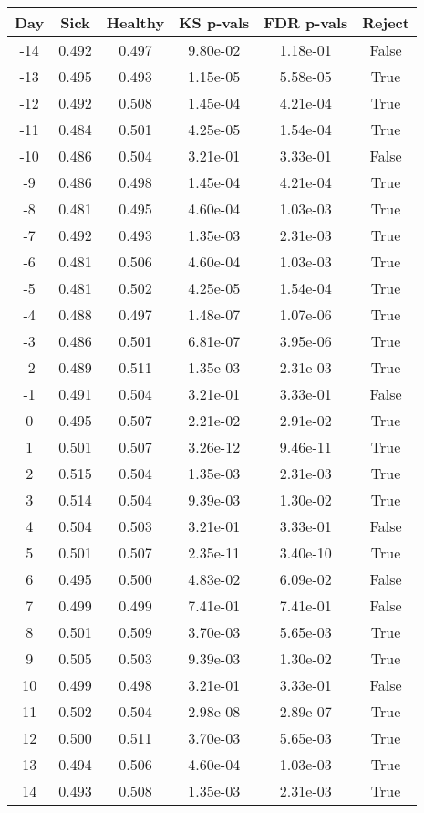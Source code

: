 \begin{tabular}{c|c|c|c|c|c}
Day &  Sick & Healthy &  KS p-vals & FDR p-vals & Reject\\
\hline
-14 & 0.492 &   0.497 &   9.80e-02 &   1.18e-01 &  False\\
-13 & 0.495 &   0.493 &   1.15e-05 &   5.58e-05 &   True\\
-12 & 0.492 &   0.508 &   1.45e-04 &   4.21e-04 &   True\\
-11 & 0.484 &   0.501 &   4.25e-05 &   1.54e-04 &   True\\
-10 & 0.486 &   0.504 &   3.21e-01 &   3.33e-01 &  False\\
 -9 & 0.486 &   0.498 &   1.45e-04 &   4.21e-04 &   True\\
 -8 & 0.481 &   0.495 &   4.60e-04 &   1.03e-03 &   True\\
 -7 & 0.492 &   0.493 &   1.35e-03 &   2.31e-03 &   True\\
 -6 & 0.481 &   0.506 &   4.60e-04 &   1.03e-03 &   True\\
 -5 & 0.481 &   0.502 &   4.25e-05 &   1.54e-04 &   True\\
 -4 & 0.488 &   0.497 &   1.48e-07 &   1.07e-06 &   True\\
 -3 & 0.486 &   0.501 &   6.81e-07 &   3.95e-06 &   True\\
 -2 & 0.489 &   0.511 &   1.35e-03 &   2.31e-03 &   True\\
 -1 & 0.491 &   0.504 &   3.21e-01 &   3.33e-01 &  False\\
  0 & 0.495 &   0.507 &   2.21e-02 &   2.91e-02 &   True\\
  1 & 0.501 &   0.507 &   3.26e-12 &   9.46e-11 &   True\\
  2 & 0.515 &   0.504 &   1.35e-03 &   2.31e-03 &   True\\
  3 & 0.514 &   0.504 &   9.39e-03 &   1.30e-02 &   True\\
  4 & 0.504 &   0.503 &   3.21e-01 &   3.33e-01 &  False\\
  5 & 0.501 &   0.507 &   2.35e-11 &   3.40e-10 &   True\\
  6 & 0.495 &   0.500 &   4.83e-02 &   6.09e-02 &  False\\
  7 & 0.499 &   0.499 &   7.41e-01 &   7.41e-01 &  False\\
  8 & 0.501 &   0.509 &   3.70e-03 &   5.65e-03 &   True\\
  9 & 0.505 &   0.503 &   9.39e-03 &   1.30e-02 &   True\\
 10 & 0.499 &   0.498 &   3.21e-01 &   3.33e-01 &  False\\
 11 & 0.502 &   0.504 &   2.98e-08 &   2.89e-07 &   True\\
 12 & 0.500 &   0.511 &   3.70e-03 &   5.65e-03 &   True\\
 13 & 0.494 &   0.506 &   4.60e-04 &   1.03e-03 &   True\\
 14 & 0.493 &   0.508 &   1.35e-03 &   2.31e-03 &   True\\
\end{tabular}